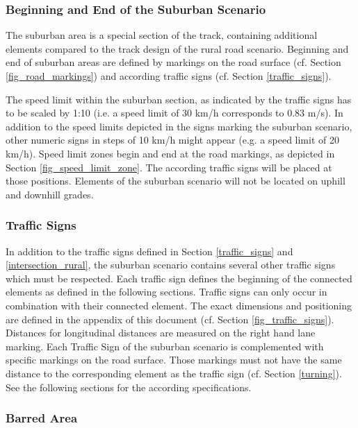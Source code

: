 \documentclass[a4paper]{report}
\begin{document}
{\subsubsection{Beginning and End of the Suburban Scenario}

The suburban area is a special section of the track, containing additional elements compared to the track design of the rural road scenario. Beginning and end of suburban areas are defined by markings on the road surface (cf. Section \ref{fig_road_markings}) and according traffic signs (cf. Section \ref{traffic_signs}). 

The speed limit within the suburban section, as indicated by the traffic signs has to be scaled by 1:10 (i.e. a speed limit of 30 km/h corresponds to 0.83 m/s). In addition to the speed limits depicted in the signs marking the suburban scenario, other numeric signs in steps of 10 km/h might appear (e.g. a speed limit of 20 km/h). Speed limit zones begin and end at the road markings, as depicted in Section \ref{fig_speed_limit_zone}. The according traffic signs will be placed at those positions. Elements of the suburban scenario will not be located on uphill and downhill grades. 

\subsubsection{Traffic Signs}

In addition to the traffic signs defined in Section \ref{traffic_signs} and \ref{intersection_rural}, the suburban scenario contains several other traffic signs which must be respected. Each traffic sign defines the beginning of the connected elements as defined in the following sections. Traffic signs can only occur in combination with their connected element. The exact dimensions and positioning are defined in the appendix of this document (cf. Section \ref{fig_traffic_signs}). Distances for longitudinal distances are measured on the right hand lane marking. Each Traffic Sign of the suburban scenario is complemented with specific markings on the road surface. Those markings must not have the same distance to the corresponding element as the traffic sign (cf. Section \ref{turning}). See the following sections for the according specifications. 

\subsubsection{Barred Area}

}
\end{document}
